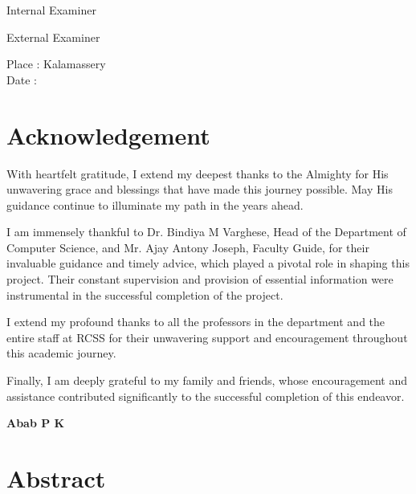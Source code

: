 \vspace{1.5cm}

\noindent
\begin{minipage}[t]{0.45\textwidth}
\flushleft
Internal Examiner
\end{minipage}
\hfill
\begin{minipage}[t]{0.45\textwidth}
\addtolength{\leftskip}{2cm}
External Examiner
\end{minipage}

\vspace{1.5cm}

\noindent
\begin{minipage}[t]{0.45\textwidth}
\flushleft
Place : Kalamassery\\
Date : 
\end{minipage}

\chapter*{Acknowledgement}
With heartfelt gratitude, I extend my deepest thanks to the Almighty for His unwavering grace and blessings that have made this journey possible. May His guidance continue to illuminate my path in the years ahead.

I am immensely thankful to Dr. Bindiya M Varghese, Head of the Department of Computer Science, and Mr. Ajay Antony Joseph, Faculty Guide, for their invaluable guidance and timely advice, which played a pivotal role in shaping this project. Their constant supervision and provision of essential information were instrumental in the successful completion of the project.

I extend my profound thanks to all the professors in the department and the entire staff at RCSS for their unwavering support and encouragement throughout this academic journey.

Finally, I am deeply grateful to my family and friends, whose encouragement and assistance contributed significantly to the successful completion of this endeavor.
\vspace{2cm}

\begin{flushright}
\textbf{Abab P K}
\end{flushright}



\chapter*{Abstract}

